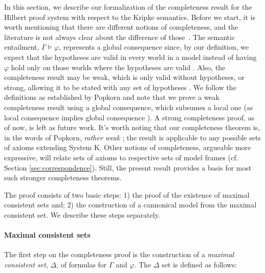 \documentclass[3p,times]{elsarticle}
\begin{document}
In this section, we describe our formalization of the completeness result for the
Hilbert proof system with respect to the Kripke semantics.
Before we start,
it is worth mentioning that there are different notions of completeness, and
the literature is not always clear about the difference of those~\cite{Popkorn_1994,modal_lean}.
The semantic entailment, $\Gamma\models\varphi$, represents a global consequence since, by our definition,
we expect that the hypotheses are valid in every world in a model instead
of having $\varphi$ hold only on those worlds where the hypotheses are valid \cite{de1999global}.
Also, the completeness result may be
weak, which is only valid without hypotheses, or strong, allowing it to be stated with any set of
hypotheses \cite{blackburn}. We follow the definitions as established by Popkorn \cite{Popkorn_1994}
and note that we prove a weak completeness result using a global consequence, which subsumes a local one (as local consequence implies global consequence
\cite{de1999global}). A strong completeness proof, as of now, is left as future work.
It's worth noting that our completeness theorem is, in the words of
Popkorn, \emph{rather weak} \cite[p. 119-120]{Popkorn_1994}; the result is applicable to any
possible sets of axioms extending System K. Other
notions of completeness, argueable more expressive, will relate sets of axioms
to respective sets of model frames (cf. Section \ref{sec:correspondence}). Still, the present result provides a basis
for most such stronger completeness theorems.


The proof consists of two
basic steps: 1) the proof of the existence of maximal consistent sets and; 2) the
construction of a cannonical model from the maximal consistent set. We describe these steps separately.

\paragraph{Maximal consistent sets} The first step on the completeness proof is the construction of a \emph{maximal consistent set}, $\Delta$, of formulas for $\Gamma$ and $\varphi$.  The $\Delta$ set
is defined as follows:
\end{document}
